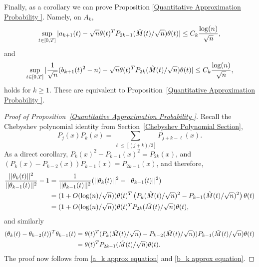 \documentclass{amsart}
\numberwithin{equation}{section}
\begin{document}
Finally, as a corollary we can prove Proposition \ref{Quantitative Approximation Probability }. Namely, on $A_k$,
\begin{equation}\label{a_k approx}
    \begin{split}
        \sup_{t\in [0,T]}|a_{k+1}(t)-\sqrt{n}\theta(t)^T P_{2k-1}(\Tilde{M}(t)/\sqrt{n})\theta(t)| \leq C_k \frac{\log(n)}{\sqrt{n}},
    \end{split}
\end{equation}
and
\begin{equation}\label{b_k approx}
    \begin{split}
        \sup_{t\in [0,T]}|\frac{1}{\sqrt{n}}(b_{k+1}(t)^2-n)-\sqrt{n}\theta(t)^T P_{2k}(\Tilde{M}(t)/\sqrt{n})\theta(t)| \leq C_k \frac{\log(n)}{\sqrt{n}},
    \end{split}
\end{equation}
holds for $k \geq 1$. These are equivalent to Proposition~\ref{Quantitative Approximation Probability }.

\begin{proof}[Proof of Proposition~\ref{Quantitative Approximation Probability }]
    Recall the Chebyshev polynomial identity from Section~\ref{Chebyshev Polynomial Section},
    \begin{equation*}
        P_{j}(x)P_k(x) = \sum_{\ell \leq [(j+k)/2]} P_{j+k-\ell}(x).
    \end{equation*}
    As a direct corollary, $P_{k}(x)^2-P_{k-1}(x)^2=P_{2k}(x)$, and $(P_{k}(x)-P_{k-2}(x))P_{k-1}(x)=P_{2k-1}(x)$, and therefore,
    \begin{equation*}
        \begin{split}
            \frac{||\theta_k(t)||^2}{||\theta_{k-1}(t)||^2}-1 &=\frac{1}{||\theta_{k-1}(t)||^2}(||\theta_k(t)||^2-||\theta_{k-1}(t)||^2) \\
            &=(1+O(\log(n)/\sqrt{n}))\theta(t)^T \left(P_{k}(\Tilde{M}(t)/\sqrt{n})^2-P_{k-1}(\Tilde{M}(t)/\sqrt{n})^2\right)\theta(t)\\
            &=(1+O(\log(n)/\sqrt{n}))\theta(t)^T P_{2k}(\Tilde{M}(t)/\sqrt{n})\theta(t),
        \end{split}
    \end{equation*}
    and similarly
    \begin{equation*}
        \begin{split}
            (\theta_{k}(t)-\theta_{k-2}(t))^T\theta_{k-1}(t)&=\theta(t)^T(P_{k}(\Tilde{M}(t)/\sqrt{n})-P_{k-2}(\Tilde{M}(t)/\sqrt{n}))P_{k-1}(\Tilde{M}(t)/\sqrt{n})\theta(t)\\
            &=\theta(t)^T P_{2k-1}(\Tilde{M}(t)/\sqrt{n})\theta(t).
        \end{split}
    \end{equation*}
    The proof now follows from \eqref{a_k approx equation} and \eqref{b_k approx equation}.
\end{proof}
\end{document}
